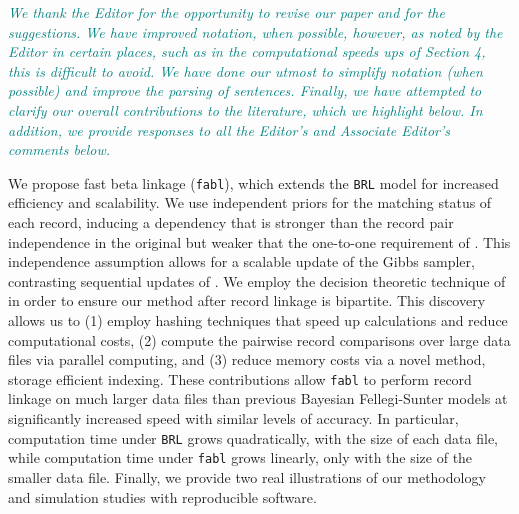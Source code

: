 \documentclass[letterpaper, parskip]{scrartcl}
\newcounter{responsectr}[section]     %
\newcommand{\reply}[1]{%
	\refstepcounter{responsectr}%
		\begin{tcolorbox}
			\itshape #1
		\end{tcolorbox}
}
\begin{document}
\reply{
\textcolor{teal}{We thank the Editor for the opportunity to revise our paper and for the suggestions. We have improved notation, when possible, however, as noted by the Editor in certain places, such as in the computational speeds ups of Section 4, this is difficult to avoid. We have done our utmost to simplify notation (when possible) and improve the parsing of sentences. Finally, we have attempted to clarify our overall contributions to the literature, which we highlight below. In addition, we provide responses to all the Editor's and Associate Editor's comments below.}


We propose fast beta linkage (\texttt{fabl}), which extends the \texttt{BRL} model for increased efficiency and scalability. We use independent priors for the matching status of each record, inducing a dependency that is stronger than the record pair independence in the original \cite{fellegi_theory_1969} but weaker that the one-to-one requirement of \cite{sadinle_bayesian_2017}. This independence assumption allows for a scalable update of the Gibbs sampler, contrasting sequential updates of \cite{sadinle_bayesian_2017}. We employ the decision theoretic  technique of \cite{sadinle_bayesian_2017} in order to ensure our method after record linkage is bipartite. This discovery allows us to (1) employ hashing techniques that speed up calculations and reduce computational costs, (2) compute the pairwise record comparisons over large data files via parallel computing, and (3) reduce memory costs via a novel method, storage efficient indexing. These contributions allow \texttt{fabl} to perform record linkage on much larger data files than previous Bayesian Fellegi-Sunter models at significantly increased speed with similar levels of accuracy. In particular, computation time under \texttt{BRL} grows quadratically, with the size of each data file, while computation time under \texttt{fabl} grows linearly, only with the size of the smaller data file. Finally, we provide two real illustrations of our methodology and simulation studies with reproducible software.

}
\end{document}
